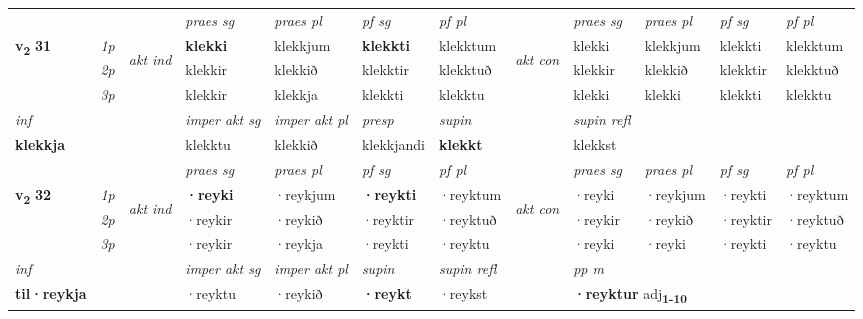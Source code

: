 \begin{longtable}[l]{X>{\footnotesize\itshape}llXXXXlXXXX}
 & &   & \textit{praes sg}  & \textit{praes pl}    & \textit{ pf sg} & \textit{pf pl} & & \textit{praes sg}  & \textit{praes pl}    & \textit{pf sg} & \textit{pf pl }  \\ \cmidrule{4-7} \cmidrule{9-12}
 \multirow{2}{*}{{{\textbf{v{\textsubscript{2}}} \Large{\textbf{31}}}}}  & 1p & \multirow{3}{*}{\begin{turn}{90}\textit{akt ind}\end{turn}} & \textbf{klekki} & klekkjum & \textbf{klekkti} & klekktum & \multirow{3}{*}{\begin{turn}{90}\textit{akt con}\end{turn}} &klekki & klekkjum & klekkti & klekktum\\*
 & 2p &  &  klekkir  & klekkið & klekktir & klekktuð & & klekkir & klekkið & klekktir & klekktuð \\*
 & 3p &  & klekkir & klekkja & klekkti & klekktu & & klekki & klekki& klekkti & klekktu \\*
\cmidrule{4-7} \cmidrule{9-12}

   {\textit{inf}} & &  & \textit{imper akt sg} & \textit{imper akt pl}   & \textit{presp} & \textit{supin} && \textit{supin refl}  \\*
  {\textbf{klekkja}} & && klekktu  & klekkið   & klekkjandi &  \textbf{klekkt} && klekkst  \\*

\midrule

 & &   & \textit{praes sg}  & \textit{praes pl}    & \textit{ pf sg} & \textit{pf pl} & & \textit{praes sg}  & \textit{praes pl}    & \textit{pf sg} & \textit{pf pl }  \\ \cmidrule{4-7} \cmidrule{9-12}
 \multirow{2}{*}{{{\textbf{v{\textsubscript{2}}} \Large{\textbf{32}}}}}  & 1p & \multirow{3}{*}{\begin{turn}{90}\textit{akt ind}\end{turn}} & \textbf{·reyki} & ·reykjum & \textbf{·reykti} & ·reyktum & \multirow{3}{*}{\begin{turn}{90}\textit{akt con}\end{turn}} &·reyki & ·reykjum & ·reykti & ·reyktum\\*
 & 2p &  &  ·reykir  & ·reykið & ·reyktir & ·reyktuð & & ·reykir & ·reykið & ·reyktir & ·reyktuð \\*
 & 3p &  & ·reykir & ·reykja & ·reykti & ·reyktu & & ·reyki & ·reyki& ·reykti & ·reyktu \\*
\cmidrule{4-7} \cmidrule{9-12}

   {\textit{inf}} & &  & \textit{imper akt sg} & \textit{imper akt pl}    & \textit{supin} & \textit{supin refl} && \textit{pp m} \\*
  {\textbf{til\allowbreak ·reykja}} & && ·reyktu  & ·reykið    &  \textbf{·reykt} & ·reykst && \multicolumn{2}{l}{\textbf{·reyktur} adj\textbf{\textsubscript{1-10}}} \\*


\end{longtable}
